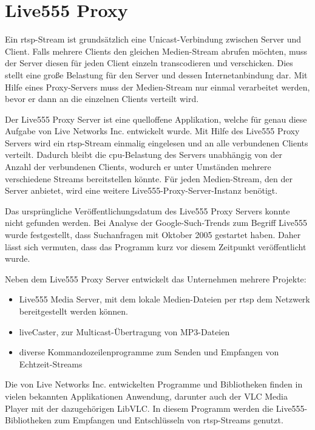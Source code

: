 
\section{Live555 Proxy}
Ein \acs{rtsp}-Stream ist grundsätzlich eine Unicast-Verbindung zwischen Server und Client.
Falls mehrere Clients den gleichen Medien-Stream abrufen möchten, muss der Server diesen für jeden Client einzeln transcodieren und verschicken.
Dies stellt eine große Belastung für den Server und dessen Internetanbindung dar.
Mit Hilfe eines Proxy-Servers muss der Medien-Stream nur einmal verarbeitet werden, bevor er dann an die einzelnen Clients verteilt wird.\par

Der Live555 Proxy Server ist eine quelloffene Applikation, welche für genau diese Aufgabe von Live Networks Inc. entwickelt wurde.
Mit Hilfe des Live555 Proxy Servers wird ein \acs{rtsp}-Stream einmalig eingelesen und an alle verbundenen Clients verteilt.
Dadurch bleibt die \acs{cpu}-Belastung des Servers unabhängig von der Anzahl der verbundenen Clients, wodurch er unter Umständen mehrere verschiedene Streams bereitstellen könnte. Für jeden Medien-Stream, den der Server anbietet, wird eine weitere Live555-Proxy-Server-Instanz benötigt.\par

Das ursprüngliche Veröffentlichungsdatum des Live555 Proxy Servers konnte nicht gefunden werden.
Bei Analyse der Google-Such-Trends zum Begriff Live555 wurde festgestellt, dass Suchanfragen mit Oktober 2005 gestartet haben.
Daher lässt sich vermuten, dass das Programm kurz vor diesem Zeitpunkt veröffentlicht wurde. \cite[vgl.][Interest over time]{live555-trends}

Neben dem Live555 Proxy Server entwickelt das Unternehmen mehrere Projekte:
\begin{itemize}
    \item Live555 Media Server, mit dem lokale Medien-Dateien per \acs{rtsp} dem Netzwerk bereitgestellt werden können.
    \item liveCaster, zur Multicast-Übertragung von MP3-Dateien
    \item diverse Kommandozeilenprogramme zum Senden und Empfangen von Echtzeit-Streams
\end{itemize}
Die von Live Networks Inc. entwickelten Programme und Bibliotheken finden in vielen bekannten Applikationen Anwendung, darunter auch der VLC Media Player mit der dazugehörigen LibVLC. In diesem Programm werden die Live555-Bibliotheken zum Empfangen und Entschlüsseln von \acs{rtsp}-Streams genutzt.